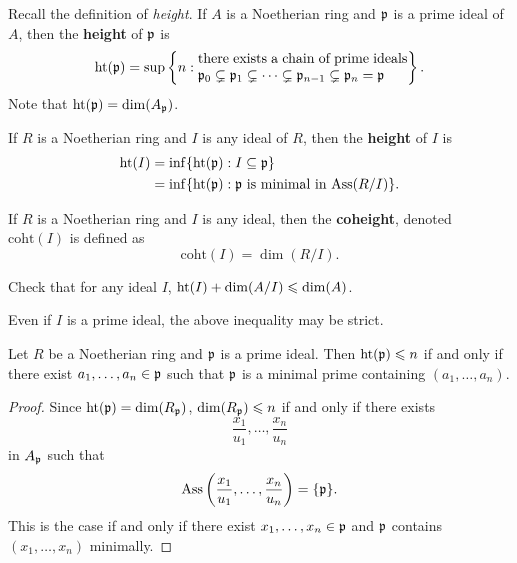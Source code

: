 \documentclass{ximera}
\begin{document}
Recall the definition of \textit{height}. If $A$ is a Noetherian ring
and $\mathfrak{p}$ is a prime ideal of $A$, then the \textbf{height} of $\mathfrak{p}$ is
\[
\h(\p) = \sup\left\{n : \begin{minipage}{15em}there exists a chain of prime ideals $\p_0\subsetneq \p_1 \subsetneq \cdots \subsetneq \p_{n-1}\subsetneq \p_n =\p$\end{minipage} \right\}.
\]
Note that $\operatorname{ht}(\mathfrak{p}) = \dim(A_{\mathfrak{p}})$.


\begin{definition}
  If $R$ is a Noetherian ring and $I$ is any ideal of $R$, then the \textbf{height} of $I$ is 
  \begin{align*}
    \operatorname{ht}(I) &= \inf\{\operatorname{ht}(\mathfrak{p}): I\subseteq\mathfrak{p}\} \\
    &= \inf\{\operatorname{ht}(\mathfrak{p}): \mathfrak{p} \text{ is minimal in $\operatorname{Ass}(R/I)$}\}.
  \end{align*}
\end{definition}

\begin{definition}
  If $R$ is a Noetherian ring and $I$ is any ideal, then the
  \textbf{coheight}, denoted $\mathrm{coht}(I)$ is defined as
  \[
  \mathrm{coht}(I) = \dim(R/I).
  \]
\end{definition}

\begin{exercise}
  Check that for any ideal $I$, $\operatorname{ht}(I)+\dim(A/I)\leqslant\dim(A)$. 
\end{exercise}

\begin{warning}
  Even if $I$ is a prime ideal, the above inequality may be strict.
\end{warning}

\begin{corollary}\label{C:KIT}
  Let $R$ be a Noetherian ring and $\mathfrak{p}$ is a prime ideal.  Then
  $\operatorname{ht}(\mathfrak{p})\leqslant n$ if and only if there exist $a_1,\dots,a_n\in\mathfrak{p}$ such
  that $\mathfrak{p}$ is a minimal prime containing $(a_1,\dots,a_n)$.
  \begin{proof}
    Since $\operatorname{ht}(\mathfrak{p}) = \dim(R_{\mathfrak{p}})$, $\dim(R_{\mathfrak{p}})\leqslant n$ if and only if there exists 
    \[
    \frac{x_1}{u_1}, \dots, \frac{x_n}{u_n}
    \]
    in $A_{\mathfrak{p}}$ such that 
    \[
    \operatorname{Ass}\left(\frac{x_1}{u_1}, \dots, \frac{x_n}{u_n}\right) = \{\mathfrak{p}\}.
    \]
    This is the case if and only if there exist $x_1,\dots, x_n\in \mathfrak{p}$
    and $\mathfrak{p}$ contains $(x_1,\dots,x_n)$ minimally.
  \end{proof}
\end{corollary}
\end{document}

